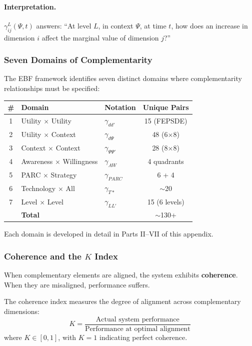 \paragraph{Interpretation.}
$\gamma^L_{ij}(\Psi, t)$ answers: ``At level $L$, in context $\Psi$, at time $t$, 
how does an increase in dimension $i$ affect the marginal value of dimension $j$?''

\subsubsection{Seven Domains of Complementarity}

The EBF framework identifies seven distinct domains where complementarity 
relationships must be specified:

\begin{center}
\renewcommand{\arraystretch}{1.4}
\begin{tabular}{|c|l|l|c|}
\hline
\textbf{\#} & \textbf{Domain} & \textbf{Notation} & \textbf{Unique Pairs} \\
\hline
1 & Utility $\times$ Utility & $\gamma_{dd'}$ & 15 (FEPSDE) \\
2 & Utility $\times$ Context & $\gamma_{d\Psi}$ & 48 (6$\times$8) \\
3 & Context $\times$ Context & $\gamma_{\Psi\Psi'}$ & 28 (8$\times$8) \\
4 & Awareness $\times$ Willingness & $\gamma_{AW}$ & 4 quadrants \\
5 & PARC $\times$ Strategy & $\gamma_{PARC}$ & 6 + 4 \\
6 & Technology $\times$ All & $\gamma_{T*}$ & $\sim$20 \\
7 & Level $\times$ Level & $\gamma_{LL'}$ & 15 (6 levels) \\
\hline
& \textbf{Total} & & $\sim$130+ \\
\hline
\end{tabular}
\end{center}

Each domain is developed in detail in Parts II--VII of this appendix.

\subsubsection{Coherence and the $K$ Index}

When complementary elements are aligned, the system exhibits \textbf{coherence}.
When they are misaligned, performance suffers.

\begin{definition}
\label{def:coherence-K}
The coherence index measures the degree of alignment across complementary 
dimensions:
\begin{equation}
    K = \frac{\text{Actual system performance}}{\text{Performance at optimal alignment}}
    \label{eq:K-def}
\end{equation}
where $K \in [0, 1]$, with $K = 1$ indicating perfect coherence.
\end{definition}

